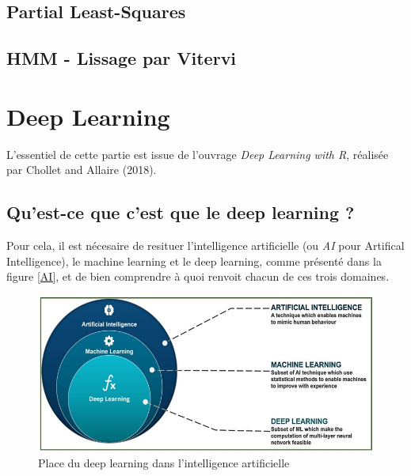 \documentclass[
]{article}
\begin{document}
\hypertarget{partial-least-squares}{%
\subsection{Partial Least-Squares}\label{partial-least-squares}}

\hypertarget{hmm---lissage-par-vitervi}{%
\subsection{HMM - Lissage par Vitervi}\label{hmm---lissage-par-vitervi}}

\hypertarget{deep-learning}{%
\section{Deep Learning}\label{deep-learning}}

L'essentiel de cette partie est issue de l'ouvrage \emph{Deep Learning
with R}, réalisée par Chollet and Allaire (2018).

\hypertarget{quest-ce-que-cest-que-le-deep-learning}{%
\subsection{Qu'est-ce que c'est que le deep learning
?}\label{quest-ce-que-cest-que-le-deep-learning}}

Pour cela, il est nécesaire de resituer l'intelligence artificielle (ou
\emph{AI} pour Artifical Intelligence), le machine learning et le deep
learning, comme présenté dans la figure \ref{AI}, et de bien comprendre
à quoi renvoit chacun de ces trois domaines.

\begin{figure}[H]
\includegraphics[width=11.04in]{DP/AI} \caption{\label{AI} Place du deep learning dans l'intelligence artificielle}\label{fig:unnamed-chunk-5}
\end{figure}
\end{document}
